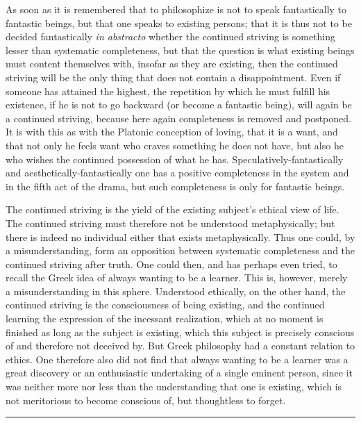 \documentclass[12pt,a4paper,openany]{book}
\newcommand{\opage}[1]{\marginnote{\footnotesize\textit{[#1]}}}
\newcommand{\sectionrule}{\par\begin{center}\rule{4em}{0.4pt}\end{center}}
\begin{document}
As soon as it is remembered that to philosophize is not to speak fantastically to
fantastic beings, but that one speaks to existing persons; that it is thus not to be
decided fantastically \textit{in abstracto} whether the continued striving is something
lesser than systematic completeness, but that the question is what existing beings
must content themselves with, insofar as they are existing, then the continued
striving will be the only thing that does not contain a disappointment. Even if
someone has attained the highest, the repetition by which he must fulfill his
existence, if he is not to go backward (or become a fantastic
\setcounter{footnote}{0}%
\opage{183}being), will again be a continued striving, because here again completeness is
removed and postponed. It is with this as with the Platonic conception of loving, that
it is a want, and that not only he feels want who craves something he does not have,
but also he who wishes the continued possession of what he has. Speculatively-fantastically
and aesthetically-fantastically one has a positive completeness in the system and in
the fifth act of the drama, but such completeness is only for fantastic beings.


The continued striving is the yield of the existing subject's ethical view of life. The
continued striving must therefore not be understood metaphysically; but there is indeed
no individual either that exists metaphysically. Thus one could, by a misunderstanding,
form an opposition between systematic completeness and the continued striving after
truth. One could then, and has perhaps even tried, to recall the Greek idea of always
wanting to be a learner. This is, however, merely a misunderstanding in this sphere.
Understood ethically, on the other hand, the continued striving is the consciousness of
being existing, and the continued learning the expression of the incessant realization,
which at no moment is finished as long as the subject is existing, which this subject
is precisely conscious of and therefore not deceived by. But Greek philosophy had a
constant relation to ethics. One therefore also did not find that always wanting to be
a learner was a great discovery or an enthusiastic undertaking of a single eminent
person, since it was neither more nor less than the understanding that one is
existing, which is not meritorious to become conscious of, but thoughtless to forget.

\sectionrule
\end{document}
